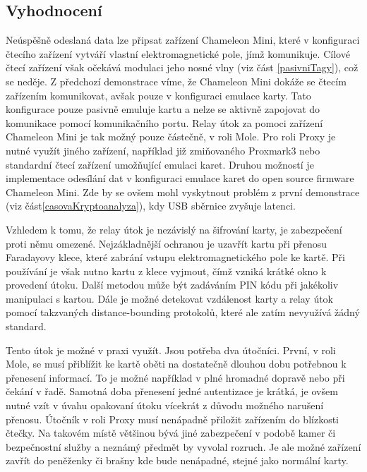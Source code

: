 \subsection{Vyhodnocení}
Neúspěšně odeslaná data lze připsat zařízení Chameleon Mini, které v konfiguraci čtecího zařízení vytváří vlastní elektromagnetické pole\cite{ChameleonDocs}, jímž komunikuje. Cílové čtecí zařízení však očekává modulaci jeho nosné vlny (viz část \ref{pasivniTagy}), což se neděje. Z předchozí demonstrace víme, že Chameleon Mini dokáže se čtecím zařízením komunikovat, avšak pouze v konfiguraci emulace karty. Tato konfigurace pouze pasivně emuluje kartu a nelze se aktivně zapojovat do komunikace pomocí komunikačního portu\cite{ChameleonDocs}. Relay útok za pomoci zařízení Chameleon Mini je tak možný pouze částečně, v roli Mole. Pro roli Proxy je nutné využít jiného zařízení, například již zmiňovaného Proxmark3 nebo standardní čtecí zařízení umožňující emulaci karet\cite{RelayUtokBP}. Druhou možností je implementace odesílání dat v konfiguraci emulace karet do open source firmware Chameleon Mini. Zde by se ovšem mohl vyskytnout problém z první demonstrace (viz část\ref{casovaKryptoanalyza}), kdy USB sběrnice zvyšuje latenci.\par
Vzhledem k tomu, že relay útok je nezávislý na šifrování karty, je zabezpečení proti němu omezené. Nejzákladnější ochranou je uzavřít kartu při přenosu Faradayovy klece, které zabrání vstupu elektromagnetického pole ke kartě. Při používání je však nutno kartu z klece vyjmout, čímž vzniká krátké okno k provedení útoku. Další metodou může být zadáváním PIN kódu při jakékoliv manipulaci s kartou. Dále je možné detekovat vzdálenost karty a relay útok pomocí takzvaných {distance-bounding} protokolů, které ale zatím nevyužívá žádný standard.\par
Tento útok je možné v praxi využít. Jsou potřeba dva útočníci. První, v roli Mole, se musí přiblížit ke kartě oběti na dostatečně dlouhou dobu potřebnou k přenesení informací. To je možné například v plné hromadné dopravě nebo při čekání v řadě. Samotná doba přenesení jedné autentizace je krátká, je ovšem nutné vzít v úvahu opakovaní útoku vícekrát z důvodu možného narušení přenosu. Útočník v roli Proxy musí nenápadně přiložit zařízením do blízkosti čtečky. Na takovém místě většinou bývá jiné zabezpečení v podobě kamer či bezpečnostní služby a neznámý předmět by vyvolal rozruch. Je ale možné zařízení zavřít do peněženky či brašny kde bude nenápadné, stejné jako normální karty.\cite{PracticalRelayAttack}


